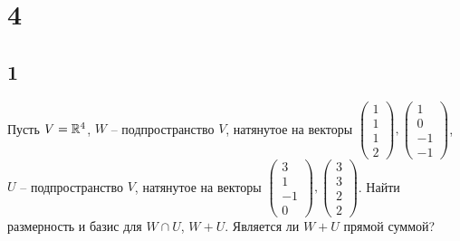 \section{4}

\subsection{1}

Пусть $ V = \mathbb{R}^4 $, $ W $ -- подпространство $ V $, натянутое на векторы $
\begin{pmatrix}
	1 \\
    1 \\
    1 \\
    2
\end{pmatrix},
\begin{pmatrix}
	1 \\
    0 \\
    -1 \\
    -1
\end{pmatrix} $, $ U $ -- подпространство $ V $, натянутое на векторы $
\begin{pmatrix}
	3 \\
    1 \\
    -1 \\
    0
\end{pmatrix},
\begin{pmatrix}
	3 \\
    3 \\
    2 \\
    2
\end{pmatrix} $. Найти размерность и базис для $ W \cap U $, $ W + U $. Является ли $ W + U $ прямой суммой?

